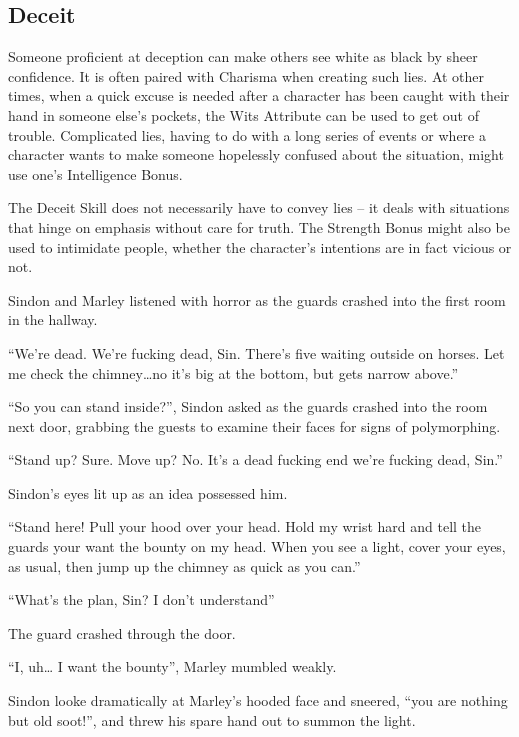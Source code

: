 \begin{multicols}{2}
\begin{figure*}[b!]
\begin{boxtext}[title=Rolling with Bad Stats]
  \end{boxtext}
\end{figure*}

\subsection{Deceit}

Someone proficient at deception can make others see white as black by sheer confidence. It is often paired with Charisma when creating such lies. At other times, when a quick excuse is needed after a character has been caught with their hand in someone else's pockets, the Wits Attribute can be used to get out of trouble. Complicated lies, having to do with a long series of events or where a character wants to make someone hopelessly confused about the situation, might use one's Intelligence Bonus.

The Deceit Skill does not necessarily have to convey lies -- it deals with situations that hinge on emphasis without care for truth.
The Strength Bonus might also be used to intimidate people, whether the character's intentions are in fact vicious or not.

\begin{exampletext}
  Sindon and Marley listened with horror as the guards crashed into the first room in the hallway.

  ``We're dead.
  We're fucking dead, Sin.
  There's five waiting outside on horses.
  Let me check the chimney\ldots no it's big at the bottom, but gets narrow above.''

  ``So you can stand inside?'', Sindon asked as the guards crashed into the room next door, grabbing the guests to examine their faces for signs of polymorphing.

  ``Stand up?
  Sure.
  Move up?
  No.
  It's a dead fucking end we're fucking dead, Sin.''

  Sindon's eyes lit up as an idea possessed him.

  ``Stand here!
  Pull your hood over your head.
  Hold my wrist hard and tell the guards your want the bounty on my head.
  When you see a light, cover your eyes, as usual, then jump up the chimney as quick as you can.''

  ``What's the plan, Sin?
  I don't understand''

  The guard crashed through the door.

  ``I, uh\ldots
  I want the bounty'', Marley mumbled weakly.

  Sindon looke dramatically at Marley's hooded face and sneered, ``you are nothing but old soot!'', and threw his spare hand out to summon the light.


\end{exampletext}
\end{multicols}
